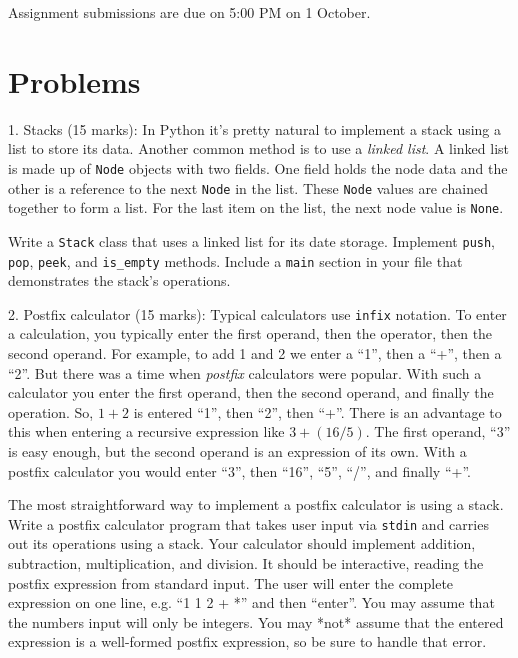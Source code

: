 \documentclass{article}
\begin{document}
Assignment submissions are due on 5:00 PM on 1 October.


\section*{Problems}

1. Stacks (15 marks): In Python it's pretty natural to implement a stack using a list to store its data. Another common method is to use a \emph{linked list}. A linked list is made up of \texttt{Node} objects with two fields. One field holds the node data and the other is a reference to the next \texttt{Node} in the list. These \texttt{Node} values are chained together to form a list. For the last item on the list, the next node value is \texttt{None}.

Write a \texttt{Stack} class that uses a linked list for its date storage. Implement \texttt{push}, \texttt{pop}, \texttt{peek}, and \texttt{is\_empty} methods. Include a \texttt{main} section in your file that demonstrates the stack's operations.

\vspace{3mm}
2. Postfix calculator (15 marks): Typical calculators use \texttt{infix} notation. To enter a calculation, you typically enter the first operand, then the operator, then the second operand. For example, to add 1 and 2 we enter a ``1'', then a ``+'', then a ``2''. But there was a time when \emph{postfix} calculators were popular. With such a calculator you enter the first operand, then the second operand, and finally the operation. So, $1 + 2$ is entered ``1'', then ``2'', then ``+''. There is an advantage to this when entering a recursive expression like $3 + (16 / 5)$. The first operand, ``3'' is easy enough, but the second operand is an expression of its own. With a postfix calculator you would enter ``3'', then ``16'', ``5'', ``/'', and finally ``+''.

The most straightforward way to implement a postfix calculator is using a stack. Write a postfix calculator program that takes user input via \texttt{stdin} and carries out its operations using a stack. Your calculator should implement addition, subtraction, multiplication, and division.
It should be interactive, reading the postfix expression from standard input. The user will enter the complete expression on one line, e.g. ``1 1 2 + *'' and then ``enter''. You may assume that the numbers input will only be integers. You may *not* assume that the entered expression is a well-formed postfix expression, so be sure to handle that error.
\end{document}
